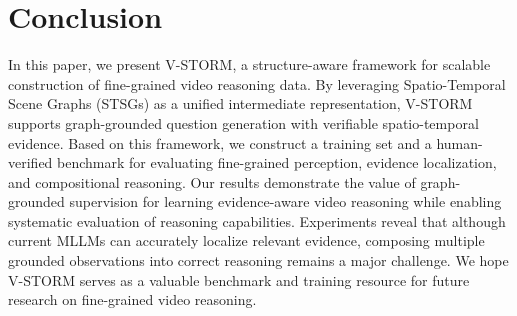 \documentclass[letterpaper]{article} %
\begin{document}
\section{Conclusion}

In this paper, we present V-STORM, a structure-aware framework for scalable construction of fine-grained video reasoning data. By leveraging Spatio-Temporal Scene Graphs (STSGs) as a unified intermediate representation, V-STORM supports graph-grounded question generation with verifiable spatio-temporal evidence. Based on this framework, we construct a training set and a human-verified benchmark for evaluating fine-grained perception, evidence localization, and compositional reasoning. Our results demonstrate the value of graph-grounded supervision for learning evidence-aware video reasoning while enabling systematic evaluation of reasoning capabilities. Experiments reveal that although current MLLMs can accurately localize relevant evidence, composing multiple grounded observations into correct reasoning remains a major challenge.
We hope V-STORM serves as a valuable benchmark and training resource for future research on fine-grained video reasoning.



% 
\end{document}
